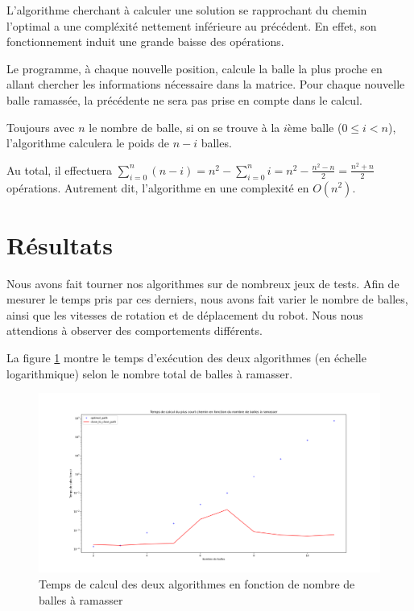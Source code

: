 \documentclass[12pt]{article}
\begin{document}
    L'algorithme cherchant à calculer une solution se rapprochant du chemin l'optimal a une compléxité nettement inférieure au précédent. En effet, son fonctionnement induit une grande baisse des opérations.

    Le programme, à chaque nouvelle position, calcule la balle la plus proche en allant chercher les informations nécessaire dans la matrice. Pour chaque nouvelle balle ramassée, la précédente ne sera pas prise en compte dans le calcul.

    Toujours avec $n$ le nombre de balle, si on se trouve à la $i$ème balle ($0\leq i<n$), l'algorithme calculera le poids de $n-i$ balles.
    
    Au total, il effectuera $\sum_{i=0}^{n}(n-i) = n^2 - \sum_{i=0}^{n}i = n^2 - \frac{n^2 - n}{2} = \frac{n^2 + n}{2}$ opérations. Autrement dit, l'algorithme en une complexité en $O(n^2)$.

    \section{Résultats}
    \label{sec:result}

    Nous avons fait tourner nos algorithmes sur de nombreux jeux de tests. Afin de mesurer le temps pris par ces derniers, nous avons fait varier le nombre de balles, ainsi que les vitesses de rotation et de déplacement du robot. Nous nous attendions à observer des comportements différents.

    La figure \ref{fig:timepathopt} montre le temps d'exécution des deux algorithmes (en échelle logarithmique) selon le nombre total de balles à ramasser. 

    \begin{figure}[H]
        \centering
        \includegraphics[width=\textwidth]{img/time_path_opt}
        \caption{Temps de calcul des deux algorithmes en fonction de nombre de balles à ramasser}
        \label{fig:timepathopt}
    \end{figure}
\end{document}
